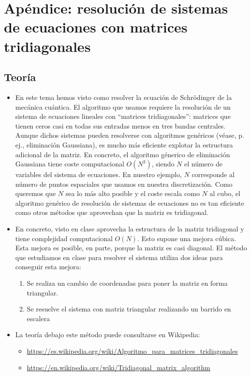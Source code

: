 \documentclass[12pt]{iopart}
\begin{document}
\section{Apéndice: resolución de sistemas de ecuaciones con matrices tridiagonales}

\subsection{Teoría}

\begin{itemize}
\item En este tema hemos visto como resolver la ecuación de Schrödinger de la mecánica cuántica. El algoritmo que usamos requiere la resolución de un sistema de ecuaciones lineales con ``matrices tridiagonales'': matrices que tienen ceros casi en todas sus entradas menos en tres bandas centrales. Aunque dichos sistemas pueden resolverse con algoritmos genéricos (véase, p. ej., eliminación Gaussiana), es mucho más eficiente explotar la estructura adicional de la matriz. En concreto, el algoritmo génerico de eliminación Gaussiana tiene coste computacional $O(N^3)$, siendo $N$ el número de variables del sistema de ecuaciones. En nuestro ejemplo, $N$ corresponde al número de puntos espaciales que usamos en nuestra discretización. Como queremos que $N$ sea lo más alto posible y el coste escala como $N$ al cubo, el algoritmo genérico de resolución de sistemas de ecuaciones no es tan eficiente como otros métodos que aprovechan que la matriz es tridiagonal.
\item En concreto, visto en clase aprovecha la estructura de la matriz tridiagonal y tiene complejidad computacional $O(N)$. Esto supone una mejora cúbica. Esta mejora es posible, en parte, porque la matriz es casi diagonal. El método que estudiamos en clase para resolver el sistema utiliza dos ideas para conseguir esta mejora:
\begin{enumerate}
\item Se realiza un cambio de coordenadas para poner la matriz en forma triangular.
\item Se resuelve el sistema con matriz triangular realizando un barrido en escalera
\end{enumerate}
\item La teoría debajo este método puede consultarse en Wikipedia:
\begin{itemize}
\item \url{https://es.wikipedia.org/wiki/Algoritmo_para_matrices_tridiagonales}
\item \url{https://en.wikipedia.org/wiki/Tridiagonal_matrix_algorithm}
\end{itemize}
\end{itemize}
\end{document}
